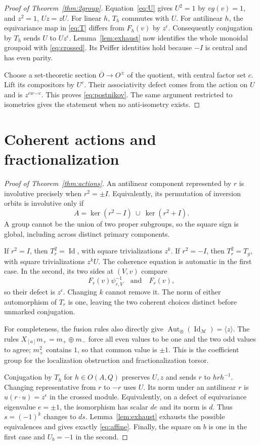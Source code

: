 \documentclass{amsart}
\theoremstyle{definition}\newtheorem{definition}[theorem]{Definition}
\theoremstyle{remark}\newtheorem{remark}[theorem]{Remark}
\newcommand{\M}{\mathcal M}\newcommand{\D}{\mathcal D}
\newcommand{\Id}{\operatorname{Id}}\newcommand{\Aut}{\operatorname{Aut}}
\begin{document}
\begin{proof}[Proof of Theorem~\ref{thm:2group}]
Equation~\eqref{eq:U} gives $U^2=1$ by $v g(v)=1$, and
$z^2=1$, $Uz=zU$. For linear $h$, $T_h$ commutes with $U$.
For antilinear $h$, the equivariance map in \eqref{eq:T} differs
from $F_h(v)$ by $z^\epsilon$. Consequently conjugation by $T_h$
sends $U$ to $Uz^\epsilon$. Lemma~\ref{lem:exhaust} now identifies
the whole monoidal groupoid with \eqref{eq:crossed}. Its Peiffer
identities hold because $-I$ is central and has even parity.

Choose a set-theoretic section $\overline O\to O^{\pm}$ of the quotient,
with central factor set
$c$. Lift its compositors by $U^c$. Their associativity defect comes
from the action on $U$ and is $z^{\epsilon w\smile c}$.
This proves \eqref{eq:postnikov}. The same argument restricted to
isometries gives the statement when no anti-isometry exists.
\end{proof}

\section{Coherent actions and fractionalization}

\begin{proof}[Proof of Theorem~\ref{thm:actions}]
An antilinear component represented by $r$ is involutive precisely
when $r^2=\pm I$. Equivalently, its permutation of inversion orbits
is involutive only if
\[
           A=\ker(r^2-I)\ \cup\ \ker(r^2+I).
\]
A group cannot be the union of two proper subgroups, so the square
sign is global, including across distinct primary components.

If $r^2=I$, then $T_r^2=\Id$, with square trivializations $z^k$.
If $r^2=-I$, then $T_r^2=T_g$, with square trivializations $z^kU$.
The coherence equation is automatic in the first case. In the second,
its two sides at $(V,v)$ compare
\[
                   F_r(v)\psi_{r,V}^{-1}\quad\text{and}\quad F_r(v),
\]
so their defect is $z^\epsilon$. Changing $k$ cannot remove it.
The norm of either automorphism of $T_r$ is one, leaving the two
coherent choices distinct before unmarked conjugation.

For completeness, the fusion rules also directly give
$\Aut_\otimes(\Id_\M)=\langle z\rangle$. The rules
$X_{[a]}m_+=m_+\oplus m_-$ force all even values to be one and the two
odd values to agree; $m_+^2$ contains $1$, so that common value is
$\pm1$. This is the coefficient group for the localization obstruction
and fractionalization torsor.

Conjugation by $T_h$ for $h\in O(A,Q)$ preserves $U,z$ and sends
$r$ to $h r h^{-1}$. Changing representative from $r$ to $-r$ uses
$U$. Its norm under an antilinear $r$ is
$u(r\cdot u)=z^\epsilon$ in the crossed module. Equivalently, on a
defect of equivariance eigenvalue $e=\pm1$, the isomorphism has
scalar $de$ and its norm is $d$. Thus $s=(-1)^k$ changes to $ds$.
Lemma~\ref{lem:exhaust} exhausts the possible equivalences and gives
exactly \eqref{eq:affine}. Finally, the square on $b$ is one in
the first case and $U_b=-1$ in the second.
\end{proof}
\end{document}
